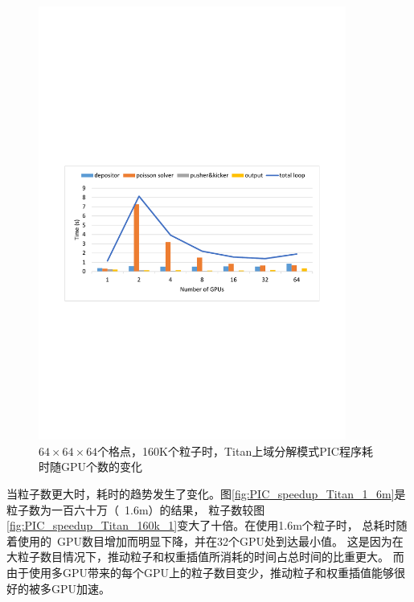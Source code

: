 \begin{figure}[!htb]
  \centering
  \includegraphics[width=0.9\textwidth]{Img/PIC_speedup_Titan_160k_2.pdf}
  \caption{$64 \times 64 \times 64$个格点，160K个粒子时，Titan上域分解模式PIC程序耗时随GPU个数的变化}
  \label{fig:PIC_speedup_Titan_160k_2}
\end{figure}

当粒子数更大时，耗时的趋势发生了变化。图\ref{fig:PIC_speedup_Titan_1_6m}是粒子数为一百六十万（~1.6m）的结果，
粒子数较图\ref{fig:PIC_speedup_Titan_160k_1}变大了十倍。在使用1.6m个粒子时，
总耗时随着使用的~GPU数目增加而明显下降，并在32个GPU处到达最小值。
这是因为在大粒子数目情况下，推动粒子和权重插值所消耗的时间占总时间的比重更大。
而由于使用多GPU带来的每个GPU上的粒子数目变少，推动粒子和权重插值能够很好的被多GPU加速。


